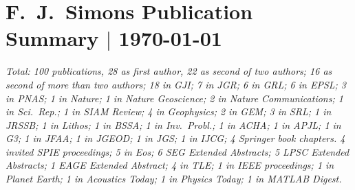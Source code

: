 \documentclass[12pt]{article}
\begin{document}
\section*{F.~J.~Simons Publication Summary $|$ \today}

\emph{Total: 100 publications,
28 as first author,
22 as second of two authors;
16 as second of more than two authors;
18 in \emph{GJI};
7 in \emph{JGR};
6 in \emph{GRL};
6 in \emph{EPSL};
3 in \emph{PNAS};
1 in \emph{Nature};
1 in \emph{Nature Geoscience};
2 in \emph{Nature Communications};
1 in \emph{Sci.~Rep.};
1 in \emph{SIAM Review};
4 in \emph{Geophysics};
2 in \emph{GEM};
3 in \emph{SRL};
1 in \emph{JRSSB};
1 in \emph{Lithos};
1 in \emph{BSSA};
1 in \emph{Inv.~Probl.};
1 in \emph{ACHA};
1 in \emph{APJL};
1 in \emph{G3};
1 in \emph{JFAA};
1 in \emph{JGEOD};
1 in \emph{JGS};
1 in \emph{IJCG};
4 \emph{Springer} book chapters.
4 invited \emph{SPIE} proceedings;
5 in \emph{Eos};
6 \emph{SEG Extended Abstracts};
5 \emph{LPSC Extended Abstracts};
1 \emph{EAGE Extended Abstract};
4 in \emph{TLE};
1 in \emph{IEEE} proceedings;
1 in \emph{Planet Earth};
1 in \emph{Acoustics Today};
1 in \emph{Physics Today};
1 in \emph{MATLAB Digest}.}

\nocite{Zhang+2023,Bevis+2019,Dahlen+2008,Guillaumin+2022,Gualtieri+2020,Harig+2012,Harig+2015a,Kopp+2009,Nolet+2019,Pipatprathanporn+2022,Pipatprathanporn+2024,Plattner+2014a,Plattner+2017a,Simon+2022,Simons+99,Simons+2003a,Simons+2006a,Simons+2006b,Simons+2009a,Simons+2011b,Simons+2013,Simons2010,Sukhovich+2015,Wang+2012a,Yuan+2015}



\end{document}
